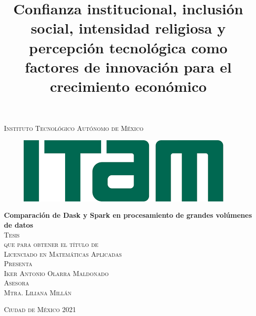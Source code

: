 \documentclass[11pt, oneside]{book}
\begin{document}

\title{Confianza institucional, inclusión social, intensidad religiosa y percepción tecnológica como factores de innovación para el crecimiento económico} %

\begin{titlepage}
\begin{center}

\textsc{\Large Instituto Tecnológico Autónomo de México}\\[2em]

\begin{figure}[h]
\begin{center}
\includegraphics[scale=0.50]{itam_logo.png}
\end{center}
\end{figure}


\textbf{\LARGE Comparación de Dask y Spark en procesamiento de grandes volúmenes de datos}\\[2em]

\textsc{\large Tesis}\\[1em]

\textsc{\large que para obtener el título de}\\[1em]

\textsc{\LARGE Licenciado en Matemáticas Aplicadas}\\[1em]

\textsc{\large Presenta}\\[1em]

\textsc{\LARGE Iker Antonio Olarra Maldonado}\\[1em]

\textsc{\large Asesora}\\[1em]

\textsc{\LARGE Mtra. Liliana Millán}\\[2em]


\end{center}

\vspace*{\fill}
\textsc{Ciudad de México \hspace*{\fill} 2021}

\end{titlepage}
\end{document}
